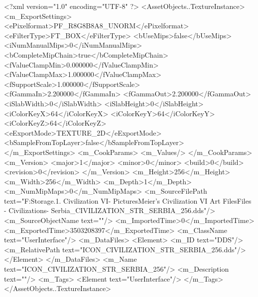 <?xml version="1.0" encoding="UTF-8" ?>
<AssetObjects..TextureInstance>
	<m_ExportSettings>
		<ePixelformat>PF_R8G8B8A8_UNORM</ePixelformat>
		<eFilterType>FT_BOX</eFilterType>
		<bUseMips>false</bUseMips>
		<iNumManualMips>0</iNumManualMips>
		<bCompleteMipChain>true</bCompleteMipChain>
		<fValueClampMin>0.000000</fValueClampMin>
		<fValueClampMax>1.000000</fValueClampMax>
		<fSupportScale>1.000000</fSupportScale>
		<fGammaIn>2.200000</fGammaIn>
		<fGammaOut>2.200000</fGammaOut>
		<iSlabWidth>0</iSlabWidth>
		<iSlabHeight>0</iSlabHeight>
		<iColorKeyX>64</iColorKeyX>
		<iColorKeyY>64</iColorKeyY>
		<iColorKeyZ>64</iColorKeyZ>
		<eExportMode>TEXTURE_2D</eExportMode>
		<bSampleFromTopLayer>false</bSampleFromTopLayer>
	</m_ExportSettings>
	<m_CookParams>
		<m_Values/>
	</m_CookParams>
	<m_Version>
		<major>1</major>
		<minor>0</minor>
		<build>0</build>
		<revision>0</revision>
	</m_Version>
	<m_Height>256</m_Height>
	<m_Width>256</m_Width>
	<m_Depth>1</m_Depth>
	<m_NumMipMaps>0</m_NumMipMaps>
	<m_SourceFilePath text="F:\Mod Storage\2.1. Civilization VI\Mods\Archive - Pictures\Sid Meier's Civilization VI Art Files\Art Files - Civilizations\Civilization - Serbia\ICON_CIVILIZATION_STR_SERBIA_256.dds"/>
	<m_SourceObjectName text=""/>
	<m_ImportedTime>0</m_ImportedTime>
	<m_ExportedTime>3503208397</m_ExportedTime>
	<m_ClassName text="UserInterface"/>
	<m_DataFiles>
		<Element>
			<m_ID text="DDS"/>
			<m_RelativePath text="ICON_CIVILIZATION_STR_SERBIA_256.dds"/>
		</Element>
	</m_DataFiles>
	<m_Name text="ICON_CIVILIZATION_STR_SERBIA_256"/>
	<m_Description text=""/>
	<m_Tags>
		<Element text="UserInterface"/>
	</m_Tags>
</AssetObjects..TextureInstance>

